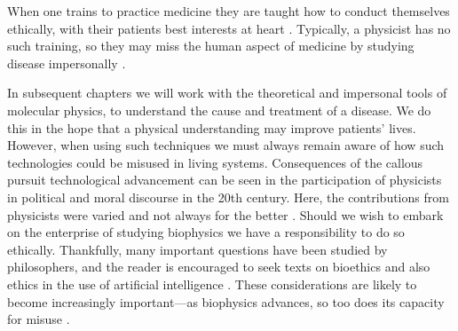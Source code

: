 When one trains to practice medicine they are taught how to conduct themselves ethically, with their patients best interests at heart \cite{hajar2017}. Typically, a physicist has no such training, so they may miss the human aspect of medicine by studying disease impersonally \cite{foucault1994}. 

In subsequent chapters we will work with the theoretical and impersonal tools of molecular physics, to understand the cause and treatment of a disease. We do this in the hope that a physical understanding may improve patients' lives. However, when using such techniques we must always remain aware of how such technologies could be misused in living systems. Consequences of the callous pursuit technological advancement can be seen in the participation of physicists in political and moral discourse in the 20th century. Here, the contributions from physicists were varied and not always for the better \cite{frank1993, gottfried1999, global2009, rhodes1986, aaronson2008, berger2016, vonneumann_britanica}. Should we wish to embark on the enterprise of studying biophysics we have a responsibility to do so ethically. Thankfully, many important questions have been studied by philosophers, and the reader is encouraged to seek texts on bioethics and also ethics in the use of artificial intelligence \cite{buchanan2000, taneri2011, genome_editting_guildelines_2017, muller2021, bostrom2014, roose2022}. These considerations are likely to become increasingly important---as biophysics advances, so too does its capacity for misuse \cite{mallapaty2022, urbina2022}. 



